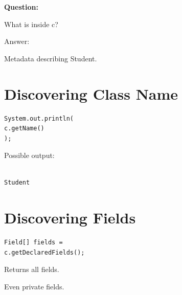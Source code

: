 \documentclass[11pt,a4paper]{book}
\begin{document}

\textbf{Question:}


What is inside c?


Answer:


Metadata describing Student.


\section{Discovering Class Name}

\begin{verbatim} 
System.out.println(
c.getName()
);
\end{verbatim}


Possible output:

\begin{verbatim}

Student

\end{verbatim}


\section{Discovering Fields}

\begin{verbatim} 
Field[] fields =
c.getDeclaredFields();
\end{verbatim}


Returns all fields.


Even private fields.

\end{document}
